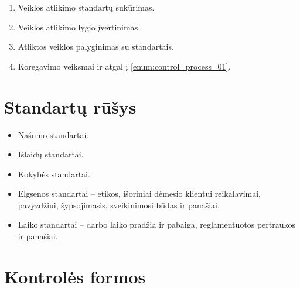 \begin{enumerate}
  \item \label{enum:control_process_01} Veiklos atlikimo standartų
    sukūrimas.
  \item Veiklos atlikimo lygio įvertinimas.
  \item Atliktos veiklos palyginimas su standartais.
  \item Koregavimo veiksmai ir atgal į \ref{enum:control_process_01}.
\end{enumerate}

\section{Standartų rūšys}

\begin{itemize}
  \item Našumo standartai.
  \item Išlaidų standartai.
  \item Kokybės standartai.
  \item Elgsenos standartai – etikos, išoriniai dėmesio klientui
    reikalavimai, pavyzdžiui, šypsojimasis, sveikinimosi būdas
    ir panašiai.
  \item Laiko standartai – darbo laiko pradžia ir pabaiga, reglamentuotos
    pertraukos ir panašiai.
\end{itemize}

\section{Kontrolės formos}

